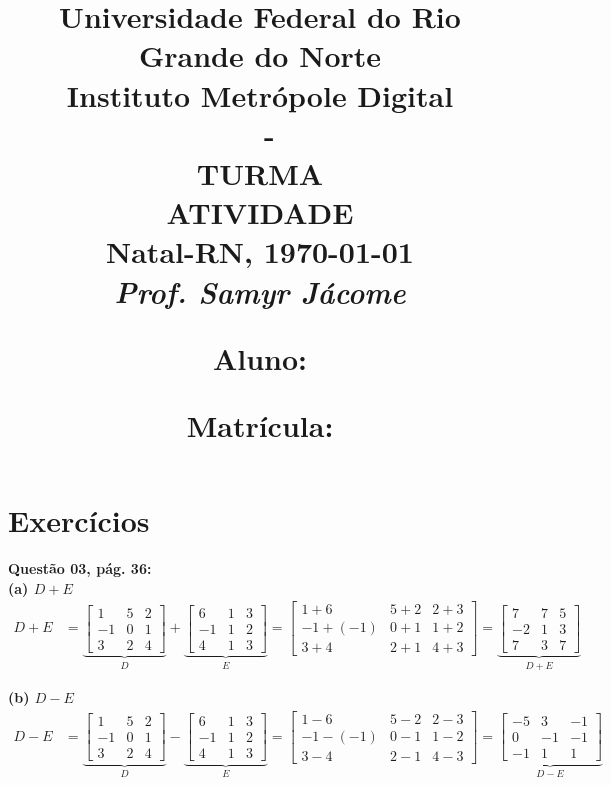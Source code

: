\documentclass[a4paper,12pt]{article}
\author{}
\date{}
\title{
\vspace{-2cm}
\Large \textbf{Universidade Federal do Rio Grande do Norte}\\ 
Instituto Metrópole Digital \\ 
\coddisciplina $\;$ - \nomedisciplina \\ 
TURMA \codturma \\
\vspace{5mm} \Large\textbf{ATIVIDADE \codatividade} \\
\normalsize Natal-RN, \today\\
\vspace{0.7cm} \large \textit{Prof. Samyr Jácome}\\

\justifying
\vspace{0.5cm} \hspace{-0.82cm}
\begin{minipage}{.6\linewidth}
    \large \textbf{Aluno:} \nomedoaluno
\end{minipage}
\begin{minipage}{.4\linewidth}
    \begin{flushright}
        \large \textbf{Matrícula:} \matricula
    \end{flushright}
\end{minipage}
}
\def\tirarident{\setlength{\parindent}{0cm}} %
\begin{document}
\maketitle

\vspace{-2cm}
\section*{Exercícios}

\tirarident

\textbf{Questão 03, pág. 36:}\\
\textbf{(a) $D + E$}
\begin{align*}
    D + E &=
    \underbrace{
    \begin{bmatrix}
        1 & 5 & 2\\
        -1  & 0 & 1\\
        3 & 2 & 4
    \end{bmatrix}}_{D} +
    \underbrace{
    \begin{bmatrix}
        6 & 1 & 3\\
        -1 & 1  & 2\\
        4 & 1  & 3
    \end{bmatrix}}_{E} 
    =
    \begin{bmatrix}
            1+6 & 5+2 & 2+3\\
            -1+(-1)  & 0+1 &1+2\\
            3+4 & 2+1 & 4+3
    \end{bmatrix}
    =
    \underbrace{\begin{bmatrix}
        7 & 7 & 5\\
        -2 & 1 & 3\\
        7 & 3 & 7
    \end{bmatrix}}_{D + E}
\end{align*}
    
\textbf{(b) $D - E$}
\begin{align*}
    D - E &=
    \underbrace{
    \begin{bmatrix}
        1 & 5 & 2\\
        -1  & 0 & 1\\
        3 & 2 & 4
    \end{bmatrix}}_{D} -
    \underbrace{
    \begin{bmatrix}
        6 & 1 & 3\\
        -1 & 1  & 2\\
        4 & 1  & 3
    \end{bmatrix}}_{E} 
    =
    \begin{bmatrix}
            1-6 & 5-2 & 2-3\\
            -1-(-1)  & 0-1 &1-2\\
            3-4 & 2-1 & 4-3
    \end{bmatrix}
    =
    \underbrace{\begin{bmatrix}
        -5 & 3 & -1\\
        0 & -1 & -1\\
        -1 & 1 & 1
    \end{bmatrix}}_{D - E}
\end{align*}
\end{document}
